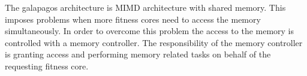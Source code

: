 The galapagos architecture is MIMD architecture with shared memory. This imposes problems when more fitness cores need to access the memory simultaneously. In order to overcome this problem the access to the memory is controlled with a memory controller. The responsibility of the memory controller is granting access and performing memory related tasks on behalf of the requesting fitness core. 
